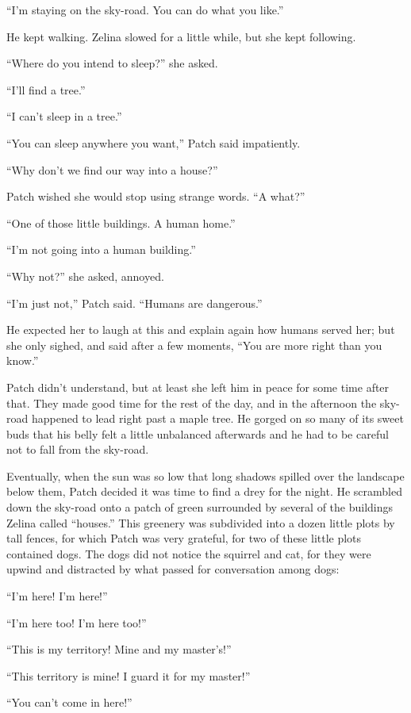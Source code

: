 \documentclass[ebook,oneside,openany,17pt]{memoir}
\begin{document}
“I’m staying on the sky-road. You can do what you like.”

He kept walking. Zelina slowed for a little while, but she kept
following.

“Where do you intend to sleep?” she asked.

“I’ll find a tree.”

“I can’t sleep in a tree.”

“You can sleep anywhere you want,” Patch said impatiently.

“Why don’t we find our way into a house?”

Patch wished she would stop using strange words. “A what?”

“One of those little buildings. A human home.”

“I’m not going into a human building.”

“Why not?” she asked, annoyed.

“I’m just not,” Patch said. “Humans are dangerous.”

He expected her to laugh at this and explain again how humans served
her; but she only sighed, and said after a few moments, “You are more
right than you know.”

Patch didn’t understand, but at least she left him in peace for some
time after that. They made good time for the rest of the day, and in
the afternoon the sky-road happened to lead right past a maple
tree. He gorged on so many of its sweet buds that his belly felt a
little unbalanced afterwards and he had to be careful not to fall from
the sky-road.

Eventually, when the sun was so low that long shadows spilled over the
landscape below them, Patch decided it was time to find a drey for the
night. He scrambled down the sky-road onto a patch of green surrounded
by several of the buildings Zelina called “houses.” This greenery was
subdivided into a dozen little plots by tall fences, for which Patch
was very grateful, for two of these little plots contained dogs. The
dogs did not notice the squirrel and cat, for they were upwind and
distracted by what passed for conversation among dogs:

“I’m here! I’m here!”

“I’m here too! I’m here too!”

“This is my territory! Mine and my master’s!”

“This territory is mine! I guard it for my master!”

“You can’t come in here!”
\end{document}
